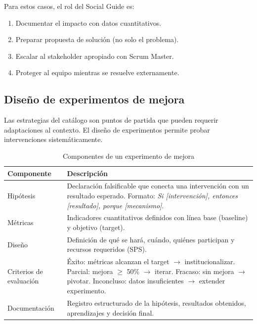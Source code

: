 Para estos casos, el rol del Social Guide es:
\begin{enumerate}
    \item Documentar el impacto con datos cuantitativos.
    \item Preparar propuesta de solución (no solo el problema).
    \item Escalar al stakeholder apropiado con Scrum Master.
    \item Proteger al equipo mientras se resuelve externamente.
\end{enumerate}

\subsection{Diseño de experimentos de mejora}

Las estrategias del catálogo son puntos de partida que pueden requerir adaptaciones al contexto. El diseño de experimentos permite probar intervenciones sistemáticamente.

\begin{table}[h]
    \centering
    \small
    \begin{tabularx}{\textwidth}{|l|X|}
        \hline
        \textbf{Componente} & \textbf{Descripción}                                                                        \\
        \hline
        Hipótesis
                            & Declaración falsificable que conecta una intervención con un resultado esperado.
        Formato: \textit{Si [intervención], entonces [resultado], porque [mecanismo]}.                                    \\
        \hline
        Métricas
                            & Indicadores cuantitativos definidos con línea base (baseline) y objetivo (target).          \\
        \hline
        Diseño
                            & Definición de qué se hará, cuándo, quiénes participan y recursos requeridos (SPS).          \\
        \hline
        Criterios de evaluación
                            & Éxito: métricas alcanzan el target $\rightarrow$ institucionalizar. \newline
        Parcial: mejora $\geq$ 50\% $\rightarrow$ iterar. \newline
        Fracaso: sin mejora $\rightarrow$ pivotar. \newline
        Inconcluso: datos insuficientes $\rightarrow$ extender experimento.                                               \\
        \hline
        Documentación
                            & Registro estructurado de la hipótesis, resultados obtenidos, aprendizajes y decisión final. \\
        \hline
    \end{tabularx}
    \caption{Componentes de un experimento de mejora}
    \label{tab:experimento-mejora}
\end{table}
\FloatBarrier

